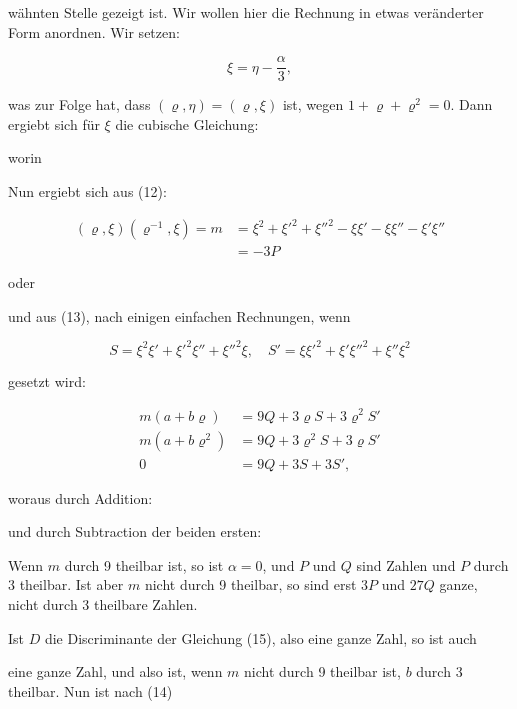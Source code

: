 wähnten Stelle gezeigt ist. Wir wollen hier die Rechnung in etwas
veränderter Form anordnen. Wir setzen:

\[ \xi = \eta - \frac{\alpha}{3}, \]

was zur Folge hat, dass $(\varrho, \eta) = (\varrho, \xi)$ ist, wegen
$1 + \varrho + \varrho^2 = 0$. Dann ergiebt sich für $\xi$ die cubische
Gleichung:


worin


Nun ergiebt sich aus (12):

\[ \begin{aligned}
(\varrho, \xi)(\varrho^{-1}, \xi) = m &= \xi^2 + \xi'^2 + \xi''^2 - \xi\xi' - \xi\xi'' - \xi'\xi'' \\
&= -3P
\end{aligned} \]

oder


und aus (13), nach einigen einfachen Rechnungen, wenn

\[ S = \xi^2\xi' + \xi'^2\xi'' + \xi''^2\xi, \quad S' = \xi\xi'^2 + \xi'\xi''^2 + \xi''\xi^2 \]

gesetzt wird:

\[ \begin{aligned}
m(a + b\varrho) &= 9Q + 3\varrho S + 3\varrho^2 S' \\
m(a + b\varrho^2) &= 9Q + 3\varrho^2 S + 3\varrho S' \\
0 &= 9Q + 3S + 3S',
\end{aligned} \]

woraus durch Addition:


und durch Subtraction der beiden ersten:


Wenn $m$ durch 9 theilbar ist, so ist $\alpha = 0$, und $P$ und $Q$ sind
 Zahlen und $P$ durch 3 theilbar. Ist aber $m$ nicht durch 9 theilbar,
so sind erst $3P$ und $27Q$ ganze, nicht durch 3 theilbare Zahlen.

Ist $D$ die Discriminante der Gleichung (15), also eine ganze Zahl, so ist
auch


eine ganze Zahl, und also ist, wenn $m$ nicht durch 9 theilbar ist, $b$
durch 3 theilbar. Nun ist nach (14)
